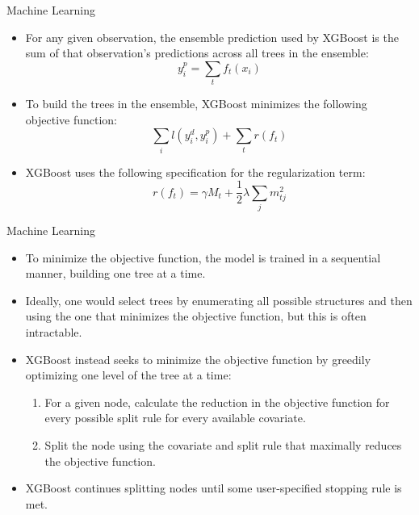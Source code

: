 \documentclass[aspectratio=169, xcolor=dvipsnames]{beamer}
\begin{document}
\begin{frame}{Machine Learning}
\begin{itemize}
\item For any given observation, the ensemble prediction used by XGBoost is the
sum of that observation's predictions across all trees in the ensemble:
\begin{equation*}
y_i^p = \sum_t f_t(x_i)
\end{equation*}

\pause
\item To build the trees in the ensemble, XGBoost minimizes the following objective function:
\begin{equation*}
\sum_i l(y_i^d, y_i^p) + \sum_t r(f_t)
\end{equation*}

\pause
\item XGBoost uses the following specification for the regularization term:
\begin{equation*}
r(f_t) = \gamma M_t + \frac{1}{2}\lambda \sum_j m_{tj}^2
\end{equation*}
\end{itemize}
\end{frame}

\begin{frame}{Machine Learning}
\begin{itemize}
\item To minimize the objective function, the model is trained in a sequential 
manner, building one tree at a time.
\pause
\item Ideally, one would select trees by enumerating all possible structures and then
using the one that minimizes the objective function, but this is often intractable.
\pause
\item XGBoost instead seeks to minimize the objective function by greedily optimizing
one level of the tree at a time:
\begin{enumerate}
\item For a given node, calculate the reduction in the objective function for every possible 
split rule for every available covariate.
\item Split the node using the covariate and split rule that maximally reduces the 
objective function.
\end{enumerate}
\pause
\item XGBoost continues splitting nodes until some user-specified stopping rule is
met.
\end{itemize}
\end{frame}
\end{document}

